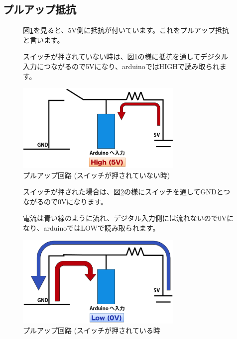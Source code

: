 \documentclass[11pt,a4paper]{jarticle}
\begin{document}
\subsection*{プルアップ抵抗}
\begin{figure}[htbp]
 \begin{minipage}{0.5\columnwidth}
 図\ref{fig:pullupSwitchOff}を見ると、5V側に抵抗が付いています。これをプルアップ抵抗と言います。
 
 スイッチが押されていない時は、図\ref{fig:pullupSwitchOff}の様に抵抗を通してデジタル入力につながるので5Vになり、arduinoではHIGHで読み取られます。
 \end{minipage}
 \begin{minipage}{0.5\columnwidth}
  \centering
  \includegraphics[width=80mm]{img/pullup_off.eps}
  \caption{プルアップ回路 (スイッチが押されていない時) }
  \label{fig:pullupSwitchOff}
 \end{minipage}
\end{figure}

\begin{figure}[htbp]
 \begin{minipage}{0.5\columnwidth}
  スイッチが押された場合は、図\ref{fig:pullupSwitchOn}の様にスイッチを通してGNDとつながるので0Vになります。
  
  電流は青い線のように流れ、デジタル入力側には流れないので0Vになり、arduinoではLOWで読み取られます。
 \end{minipage}
 \begin{minipage}{0.5\columnwidth}
  \centering
  \includegraphics[width=80mm]{img/pullup_on.eps}
  \caption{プルアップ回路 (スイッチが押されている時}
  \label{fig:pullupSwitchOn}
 \end{minipage}
\end{figure}
\end{document}
